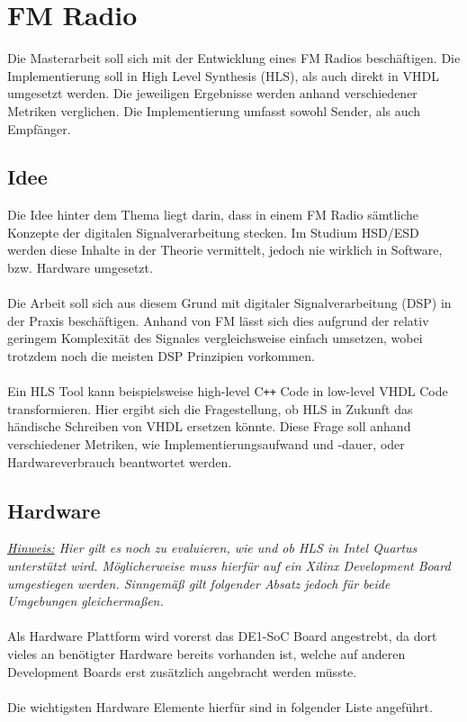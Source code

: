 \section{FM Radio}

Die Masterarbeit soll sich mit der Entwicklung eines FM Radios beschäftigen.
Die Implementierung soll in High Level Synthesis (HLS), als auch direkt in VHDL umgesetzt werden. Die jeweiligen Ergebnisse werden anhand verschiedener Metriken verglichen.
Die Implementierung umfasst sowohl Sender, als auch Empfänger.

\subsection{Idee}

Die Idee hinter dem Thema liegt darin, dass in einem FM Radio sämtliche Konzepte der digitalen Signalverarbeitung stecken. Im Studium HSD/ESD werden diese Inhalte in der Theorie vermittelt, jedoch nie wirklich in Software, bzw. Hardware umgesetzt.\\
\\
Die Arbeit soll sich aus diesem Grund mit digitaler Signalverarbeitung (DSP) in der Praxis beschäftigen. Anhand von FM lässt sich dies aufgrund der relativ geringem Komplexität des Signales vergleichsweise einfach umsetzen, wobei trotzdem noch die meisten DSP Prinzipien vorkommen.\\
\\
Ein HLS Tool kann beispielsweise high-level C\texttt{++} Code in low-level VHDL Code transformieren. Hier ergibt sich die Fragestellung, ob HLS in Zukunft das händische Schreiben von VHDL ersetzen könnte. Diese Frage soll anhand verschiedener Metriken, wie Implementierungsaufwand und -dauer, oder Hardwareverbrauch beantwortet werden.

\subsection{Hardware}

\textit{\underline{Hinweis:} Hier gilt es noch zu evaluieren, wie und ob HLS in Intel Quartus unterstützt wird. Möglicherweise muss hierfür auf ein Xilinx Development Board umgestiegen werden. Sinngemäß gilt folgender Absatz jedoch für beide Umgebungen gleichermaßen.}\\
\\
Als Hardware Plattform wird vorerst das DE1-SoC Board angestrebt, da dort vieles an benötigter Hardware bereits vorhanden ist, welche auf anderen Development Boards erst zusätzlich angebracht werden müsste.\\
\\
Die wichtigsten Hardware Elemente hierfür sind in folgender Liste angeführt.

